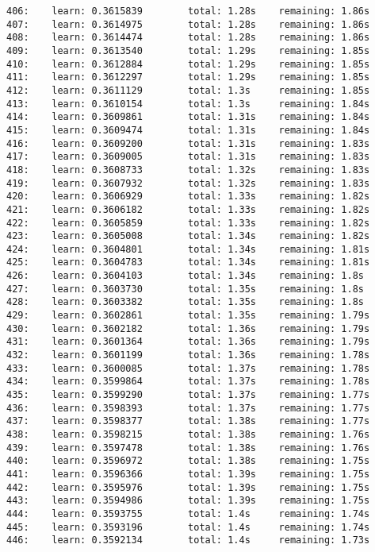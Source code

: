 \documentclass[11pt]{article}
\begin{document}
\begin{Verbatim}[commandchars=\\\{\}]
406:    learn: 0.3615839        total: 1.28s    remaining: 1.86s
407:    learn: 0.3614975        total: 1.28s    remaining: 1.86s
408:    learn: 0.3614474        total: 1.28s    remaining: 1.86s
409:    learn: 0.3613540        total: 1.29s    remaining: 1.85s
410:    learn: 0.3612884        total: 1.29s    remaining: 1.85s
411:    learn: 0.3612297        total: 1.29s    remaining: 1.85s
412:    learn: 0.3611129        total: 1.3s     remaining: 1.85s
413:    learn: 0.3610154        total: 1.3s     remaining: 1.84s
414:    learn: 0.3609861        total: 1.31s    remaining: 1.84s
415:    learn: 0.3609474        total: 1.31s    remaining: 1.84s
416:    learn: 0.3609200        total: 1.31s    remaining: 1.83s
417:    learn: 0.3609005        total: 1.31s    remaining: 1.83s
418:    learn: 0.3608733        total: 1.32s    remaining: 1.83s
419:    learn: 0.3607932        total: 1.32s    remaining: 1.83s
420:    learn: 0.3606929        total: 1.33s    remaining: 1.82s
421:    learn: 0.3606182        total: 1.33s    remaining: 1.82s
422:    learn: 0.3605859        total: 1.33s    remaining: 1.82s
423:    learn: 0.3605008        total: 1.34s    remaining: 1.82s
424:    learn: 0.3604801        total: 1.34s    remaining: 1.81s
425:    learn: 0.3604783        total: 1.34s    remaining: 1.81s
426:    learn: 0.3604103        total: 1.34s    remaining: 1.8s
427:    learn: 0.3603730        total: 1.35s    remaining: 1.8s
428:    learn: 0.3603382        total: 1.35s    remaining: 1.8s
429:    learn: 0.3602861        total: 1.35s    remaining: 1.79s
430:    learn: 0.3602182        total: 1.36s    remaining: 1.79s
431:    learn: 0.3601364        total: 1.36s    remaining: 1.79s
432:    learn: 0.3601199        total: 1.36s    remaining: 1.78s
433:    learn: 0.3600085        total: 1.37s    remaining: 1.78s
434:    learn: 0.3599864        total: 1.37s    remaining: 1.78s
435:    learn: 0.3599290        total: 1.37s    remaining: 1.77s
436:    learn: 0.3598393        total: 1.37s    remaining: 1.77s
437:    learn: 0.3598377        total: 1.38s    remaining: 1.77s
438:    learn: 0.3598215        total: 1.38s    remaining: 1.76s
439:    learn: 0.3597478        total: 1.38s    remaining: 1.76s
440:    learn: 0.3596972        total: 1.38s    remaining: 1.75s
441:    learn: 0.3596366        total: 1.39s    remaining: 1.75s
442:    learn: 0.3595976        total: 1.39s    remaining: 1.75s
443:    learn: 0.3594986        total: 1.39s    remaining: 1.75s
444:    learn: 0.3593755        total: 1.4s     remaining: 1.74s
445:    learn: 0.3593196        total: 1.4s     remaining: 1.74s
446:    learn: 0.3592134        total: 1.4s     remaining: 1.73s

\end{Verbatim}
\end{document}
